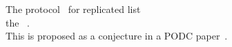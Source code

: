 
\begin{frame}{}
  \begin{center}
    {\Large The  protocol~ for replicated list \\
     the ~.}  \\[25pt]

    {\large This is proposed as a conjecture in a PODC paper~.}
  \end{center}
\end{frame}

